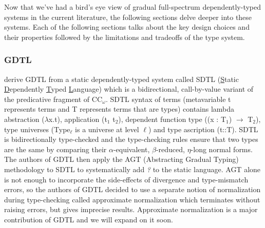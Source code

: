 \documentclass{article}
\theoremstyle{definition}
\newcommand{\Scode}[1]{{\fontfamily{cmss}\selectfont\color{Mahogany}#1}}
\newcommand{\Gcode}[1]{{\color{OliveGreen}\textit{#1}}}
\newcommand{\Ccode}[1]{{\color{BlueViolet}\textbf{#1}}}
\begin{document}
%

Now that we've had a bird's eye view of gradual full-spectrum dependently-typed
systems in the current literature, the following sections delve deeper into
these systems. Each of the following sections talks about the key design choices
and their properties followed by the limitations and tradeoffs of the type
system.

\subsubsection{GDTL}

\citet{eremondi_approximate_2019} derive GDTL from a static dependently-typed
system called SDTL (\underline{S}tatic \underline{D}ependently \underline{T}yped
\underline{L}anguage) which is a bidirectional, call-by-value variant of the
predicative fragment of CC\(_\omega\)\cite{coquand_calculus_1988}. SDTL syntax
of terms (metavariable \Scode{t} represents terms and \Scode{T} represents terms
that are types) contains lambda abstraction (\Scode{\(\lambda\)x.t}),
application (\Scode{t\(_1\) t\(_2\)}), dependent function type (\Scode{(x :
  T\(_1\)) \(\to\) T\(_2\)}), type universes (\Scode{Type\(_\ell\)} is a
universe at level \(\ell\)) and type ascription (\Scode{t::T}). SDTL is
bidirectionally type-checked and the type-checking rules ensure that two types
are the same by comparing their \(\alpha\)-equivalent, \(\beta\)-reduced,
\(\eta\)-long normal forms. The authors of GDTL then apply the AGT (Abstracting
Gradual Typing) methodology\cite{garcia_abstracting_2016} to SDTL to
systematically add \Gcode{?} to the static language. AGT alone is not enough to
incorporate the side-effects of divergence and type-mismatch errors, so the
authors of GDTL decided to use a separate notion of normalization during
type-checking called approximate normalization which terminates without raising
errors, but gives imprecise results. Approximate normalization is a major
contribution of GDTL and we will expand on it soon.
\end{document}
